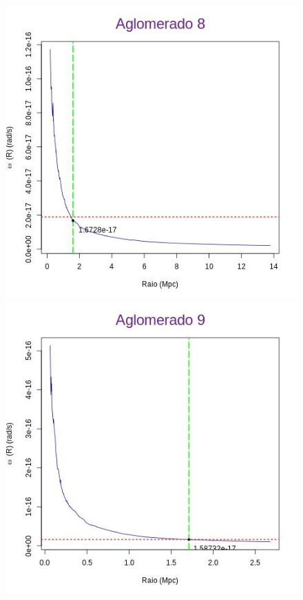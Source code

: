 \begin{apendicesenv}
\begin{figure}[H]
\begin{center}
\includegraphics[scale=.3]{04-figuras/selec20/perfil08}
\includegraphics[scale=.3]{04-figuras/selec20/perfil09}

\end{center}
\end{figure}
\end{apendicesenv}
